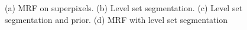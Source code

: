 \documentclass{article} %
\begin{document}
\begin{figure}[htbp]
{ }  
\caption{(a)  MRF on superpixels. (b) Level set segmentation. (c) Level set segmentation and prior.  (d) MRF with level set segmentation}
\label{Individualresults}
 \end{figure}
\end{document}
